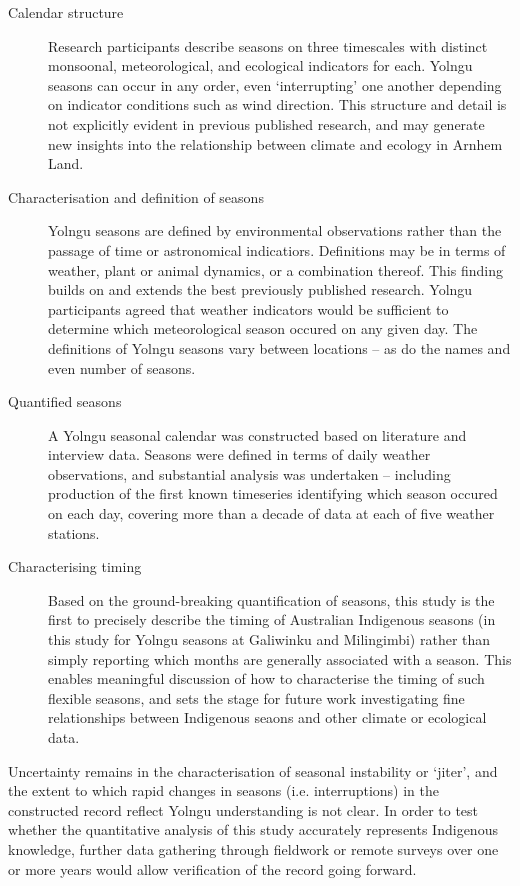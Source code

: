 \begin{description}
\item[Calendar structure]
    Research participants describe seasons on three timescales with distinct
    monsoonal, meteorological, and ecological indicators for each.
    Yolngu seasons can occur in any order, even `interrupting' one another
    depending on indicator conditions such as wind direction.  This structure
    and detail is not explicitly evident in previous published research, and
    may generate new insights into the relationship between climate and
    ecology in Arnhem Land.

\item[Characterisation and definition of seasons]
    Yolngu seasons are defined by environmental observations rather than the
    passage of time or astronomical indicatiors.  Definitions may be in terms
    of weather, plant or animal dynamics, or a combination thereof.
    This finding builds on and extends the best previously published research.
    Yolngu participants agreed that weather indicators would be sufficient to
    determine which meteorological season occured on any given day.  The definitions of
    Yolngu seasons vary between locations -- as do the names and even number
    of seasons.

\item[Quantified seasons]
    A Yolngu seasonal calendar was constructed based on literature
    and interview data.  Seasons were defined in terms of daily weather
    observations, and substantial analysis was undertaken -- including
    production of the first known timeseries identifying which season occured
    on each day, covering more than a decade of data at each of five weather
    stations.

\item[Characterising timing]
    Based on the ground-breaking quantification of seasons, this study is the
    first to precisely describe the timing of Australian Indigenous seasons
    (in this study for Yolngu seasons at Galiwinku and Milingimbi)
    rather than simply reporting which months
    are generally associated with a season.  This enables meaningful
    discussion of how to characterise the timing of such flexible seasons,
    and sets the stage for future work investigating fine relationships between
    Indigenous seaons and other climate or ecological data.
\end{description}


Uncertainty remains in the characterisation of seasonal instability or `jiter',
and the extent to which rapid changes in seasons (i.e. interruptions) in the
constructed record reflect Yolngu understanding is not clear.
In order to test whether the quantitative analysis of this study accurately
represents Indigenous knowledge, further data gathering through fieldwork or
remote surveys over one or more years would allow verification of the record
going forward.

